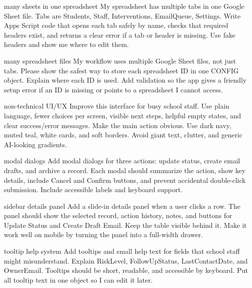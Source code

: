 \documentclass[10pt]{article}
\begin{document}
\begin{promptbox}{many sheets in one spreadsheet}
My spreadsheet has multiple tabs in one Google Sheet file. Tabs are Students, Staff, Interventions, EmailQueue, Settings. Write Apps Script code that opens each tab safely by name, checks that required headers exist, and returns a clear error if a tab or header is missing. Use fake headers and show me where to edit them.
\end{promptbox}

\begin{promptbox}{many spreadsheet files}
My workflow uses multiple Google Sheet files, not just tabs. Please show the safest way to store each spreadsheet ID in one CONFIG object. Explain where each ID is used. Add validation so the app gives a friendly setup error if an ID is missing or points to a spreadsheet I cannot access.
\end{promptbox}

\begin{promptbox}{non-technical UI/UX}
Improve this interface for busy school staff. Use plain language, fewer choices per screen, visible next steps, helpful empty states, and clear success/error messages. Make the main action obvious. Use dark navy, muted teal, white cards, and soft borders. Avoid giant text, clutter, and generic AI-looking gradients.
\end{promptbox}

\begin{promptbox}{modal dialogs}
Add modal dialogs for three actions: update status, create email drafts, and archive a record. Each modal should summarize the action, show key details, include Cancel and Confirm buttons, and prevent accidental double-click submission. Include accessible labels and keyboard support.
\end{promptbox}

\begin{promptbox}{sidebar details panel}
Add a slide-in details panel when a user clicks a row. The panel should show the selected record, action history, notes, and buttons for Update Status and Create Draft Email. Keep the table visible behind it. Make it work well on mobile by turning the panel into a full-width drawer.
\end{promptbox}

\begin{promptbox}{tooltip help system}
Add tooltips and small help text for fields that school staff might misunderstand. Explain RiskLevel, FollowUpStatus, LastContactDate, and OwnerEmail. Tooltips should be short, readable, and accessible by keyboard. Put all tooltip text in one object so I can edit it later.
\end{promptbox}
\end{document}
